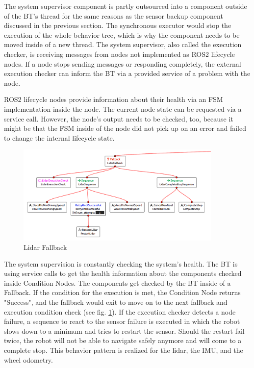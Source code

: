 The system supervisor component is partly outsourced into a component outside of the BT's thread for the same reasons as the sensor backup component discussed in the previous section. The synchronous executor would stop the execution of the whole behavior tree, which is why the component needs to be moved inside of a new thread. The system supervisor, also called the execution checker, is receiving messages from nodes not implemented as ROS2 lifecycle nodes. If a node stops sending messages or responding completely, the external execution checker can inform the BT via a provided service of a problem with the node. 

ROS2 lifecycle nodes provide information about their health via an FSM implementation inside the node. The current node state can be requested via a service call. However, the node's output needs to be checked, too, because it might be that the FSM inside of the node did not pick up on an error and failed to change the internal lifecycle state. 

\begin{figure}[ht]
	\centering
	\includegraphics[width=0.9\textwidth]{images/sensor_fallback_inverted.png}
	\caption{Lidar Fallback}
	\label{fig:lidar_fallback}
\end{figure}

The system supervision is constantly checking the system's health. The BT is using service calls to get the health information about the components checked inside Condition Nodes. The components get checked by the BT inside of a Fallback. If the condition for the execution is met, the Condition Node returns "Success", and the fallback would exit to move on to the next fallback and execution condition check (see fig. \ref{fig:lidar_fallback}). If the execution checker detects a node failure, a sequence to react to the sensor failure is executed in which the robot slows down to a minimum and tries to restart the sensor. Should the restart fail twice, the robot will not be able to navigate safely anymore and will come to a complete stop. This behavior pattern is realized for the lidar, the IMU, and the wheel odometry. 


